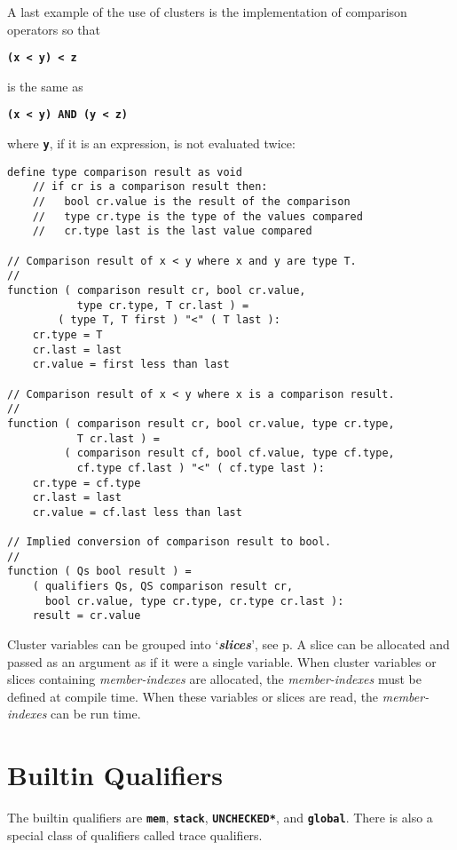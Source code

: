\documentclass[12pt]{article}
\newcommand{\TT}[1]{{\tt \bfseries #1}}
\newcommand{\skey}[2]{{\bf \em #1#2}\index{#1}}
\newcommand{\pagref}[1]{p\pageref{#1}}
\newenvironment{indpar}[1][0.3in]%
	{\begin{list}{}%
		     {\setlength{\itemsep}{0in}%
		      \setlength{\topsep}{0in}%
		      \setlength{\parsep}{1ex}%
		      \setlength{\labelwidth}{#1}%
		      \setlength{\leftmargin}{#1}%
		      \addtolength{\leftmargin}{\labelsep}}%
	 \item}%
	{\end{list}}
\begin{document}
A last example of the use of clusters is the implementation of
comparison operators so that
\begin{center}
\TT{(x~<~y)~<~z}
\end{center}
is the same as
\begin{center}
\TT{(x~<~y) AND (y~<~z)}
\end{center}
where \TT{y}, if it is an expression,
is not evaluated twice:\label{COMPARISON-RESULTS}
\begin{indpar}\begin{verbatim}
define type comparison result as void
    // if cr is a comparison result then:
    //   bool cr.value is the result of the comparison
    //   type cr.type is the type of the values compared
    //   cr.type last is the last value compared

// Comparison result of x < y where x and y are type T.
//
function ( comparison result cr, bool cr.value,
           type cr.type, T cr.last ) =
        ( type T, T first ) "<" ( T last ):
    cr.type = T
    cr.last = last
    cr.value = first less than last

// Comparison result of x < y where x is a comparison result.
//
function ( comparison result cr, bool cr.value, type cr.type,
           T cr.last ) =
         ( comparison result cf, bool cf.value, type cf.type,
           cf.type cf.last ) "<" ( cf.type last ):
    cr.type = cf.type
    cr.last = last
    cr.value = cf.last less than last

// Implied conversion of comparison result to bool.
//
function ( Qs bool result ) =
    ( qualifiers Qs, QS comparison result cr,
      bool cr.value, type cr.type, cr.type cr.last ):
    result = cr.value
\end{verbatim}\end{indpar}

Cluster variables can be grouped into `\skey{slice}s', see
\pagref{SLICE}.  A slice can be allocated and passed
as an argument as if it were a single variable.  When cluster
variables or slices containing {\em member-indexes} are allocated,
the {\em member-indexes} must be defined at compile time.
When these variables or slices are read, the
{\em member-indexes} can be run time.

\section{Builtin Qualifiers}
\label{BUILTIN-QUALIFIERS}

The builtin qualifiers are \TT{mem}, \TT{stack}, \TT{*UNCHECKED*},
and \TT{global}.
There is also a special class of qualifiers called trace qualifiers.
\end{document}
